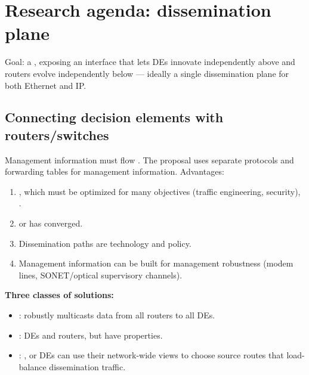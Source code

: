 \section{Research agenda: dissemination plane}
Goal: a , exposing an interface that lets DEs innovate independently above and routers evolve independently below --- ideally a single dissemination plane for both Ethernet and IP.

\subsection{Connecting decision elements with routers/switches}
Management information must flow . The proposal uses separate protocols and forwarding tables for management information. Advantages:
\begin{enumerate}
\item {}, which must be optimized for many objectives (traffic engineering, security), .
\item {} or has converged.
\item Dissemination paths are  technology and policy.
\item Management information can be  built for management robustness (modem lines, SONET/optical supervisory channels).
\end{enumerate}

\textbf{Three classes of solutions:}
\begin{itemize}
\item {}: robustly multicasts data from all routers to all DEs. 
\item {}:  DEs and routers, but have  properties.
\item {}: , or DEs can use their network-wide views to choose source routes that load-balance dissemination traffic.
\end{itemize}

